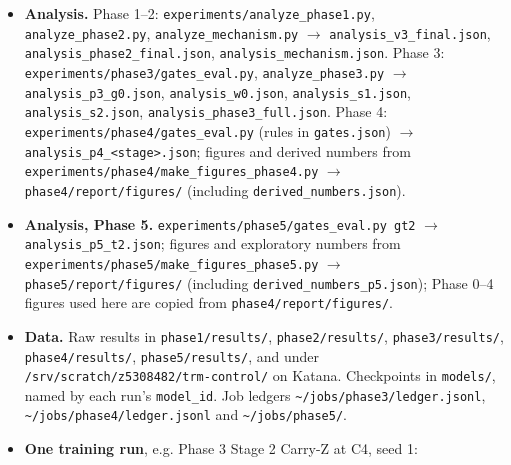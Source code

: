 \documentclass[11pt]{article}
\begin{document}
\begin{itemize}
\item \textbf{Analysis.} Phase 1--2: \texttt{experiments/\allowbreak{}analyze\_\allowbreak{}phase1.\allowbreak{}py}, \texttt{analyze\_\allowbreak{}phase2.\allowbreak{}py}, \texttt{analyze\_\allowbreak{}mechanism.\allowbreak{}py} $\rightarrow$ \texttt{analysis\_\allowbreak{}v3\_\allowbreak{}final.\allowbreak{}json}, \texttt{analysis\_\allowbreak{}phase2\_\allowbreak{}final.\allowbreak{}json}, \texttt{analysis\_\allowbreak{}mechanism.\allowbreak{}json}. Phase 3: \texttt{experiments/\allowbreak{}phase3/\allowbreak{}gates\_\allowbreak{}eval.\allowbreak{}py}, \texttt{analyze\_\allowbreak{}phase3.\allowbreak{}py} $\rightarrow$ \texttt{analysis\_\allowbreak{}p3\_\allowbreak{}g0.\allowbreak{}json}, \texttt{analysis\_\allowbreak{}w0.\allowbreak{}json}, \texttt{analysis\_\allowbreak{}s1.\allowbreak{}json}, \texttt{analysis\_\allowbreak{}s2.\allowbreak{}json}, \texttt{analysis\_\allowbreak{}phase3\_\allowbreak{}full.\allowbreak{}json}. Phase 4: \texttt{experiments/\allowbreak{}phase4/\allowbreak{}gates\_\allowbreak{}eval.\allowbreak{}py} (rules in \texttt{gates.json}) $\rightarrow$ \texttt{analysis\_\allowbreak{}p4\_\allowbreak{}<stage>.\allowbreak{}json}; figures and derived numbers from \texttt{experiments/\allowbreak{}phase4/\allowbreak{}make\_\allowbreak{}figures\_\allowbreak{}phase4.\allowbreak{}py} $\rightarrow$ \texttt{phase4/\allowbreak{}report/\allowbreak{}figures/\allowbreak{}} (including \texttt{derived\_\allowbreak{}numbers.\allowbreak{}json}).
\item \textbf{Analysis, Phase 5.} \texttt{experiments/\allowbreak{}phase5/\allowbreak{}gates\_\allowbreak{}eval.\allowbreak{}py gt2} $\rightarrow$ \texttt{analysis\_\allowbreak{}p5\_\allowbreak{}t2.\allowbreak{}json}; figures and exploratory numbers from \texttt{experiments/\allowbreak{}phase5/\allowbreak{}make\_\allowbreak{}figures\_\allowbreak{}phase5.\allowbreak{}py} $\rightarrow$ \texttt{phase5/\allowbreak{}report/\allowbreak{}figures/\allowbreak{}} (including \texttt{derived\_\allowbreak{}numbers\_\allowbreak{}p5.\allowbreak{}json}); Phase 0--4 figures used here are copied from \texttt{phase4/\allowbreak{}report/\allowbreak{}figures/\allowbreak{}}.
\item \textbf{Data.} Raw results in \texttt{phase1/\allowbreak{}results/\allowbreak{}}, \texttt{phase2/\allowbreak{}results/\allowbreak{}}, \texttt{phase3/\allowbreak{}results/\allowbreak{}}, \texttt{phase4/\allowbreak{}results/\allowbreak{}}, \texttt{phase5/\allowbreak{}results/\allowbreak{}}, and under \texttt{/\allowbreak{}srv/\allowbreak{}scratch/\allowbreak{}z5308482/\allowbreak{}trm-control/\allowbreak{}} on Katana. Checkpoints in \texttt{models/}, named by each run's \texttt{model\_id}. Job ledgers \texttt{\textasciitilde{}/\allowbreak{}jobs/\allowbreak{}phase3/\allowbreak{}ledger.\allowbreak{}jsonl}, \texttt{\textasciitilde{}/\allowbreak{}jobs/\allowbreak{}phase4/\allowbreak{}ledger.\allowbreak{}jsonl} and \texttt{\textasciitilde{}/\allowbreak{}jobs/\allowbreak{}phase5/\allowbreak{}}.
\item \textbf{One training run}, e.g. Phase 3 Stage 2 Carry-Z at C4, seed 1:
\end{itemize}
\end{document}
